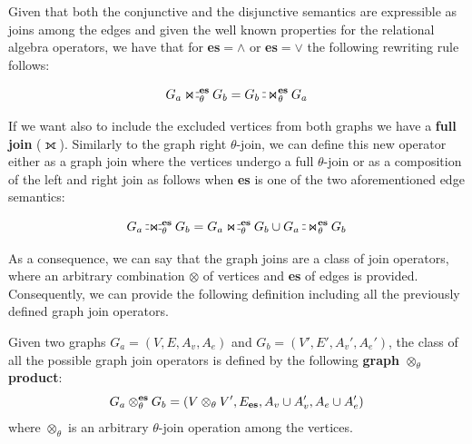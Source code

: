 Given that both the conjunctive and the disjunctive semantics are expressible as joins among the edges and given the well known  properties for the relational algebra operators, we have that for \textbf{es}$=\wedge$ or \textbf{es}$=\vee$ the following rewriting rule follows:

\[G_a\rightouterjoin_\theta^{\textbf{\textup{es}}} G_b = G_b\leftouterjoin_\theta^{\textbf{\textup{es}}} G_a\]

If we want also to include
the excluded vertices from both graphs we have a \textbf{full join}  ($\fullouterjoin$). Similarly to the graph right $\theta$-join, we can define this new operator either as a graph join where the vertices undergo a full $\theta$-join or as a composition of the left and right join as follows when \textbf{es} is one of the two aforementioned edge semantics:

\[G_a\fullouterjoin_\theta^{\textbf{\textup{es}}} G_b = G_a\rightouterjoin_\theta^{\textbf{\textup{es}}} G_b \cup G_a\leftouterjoin_\theta^{\textbf{\textup{es}}} G_b\]

As a consequence, we can say that the graph joins are a class of join operators, where an arbitrary combination $\otimes$ of vertices and \textbf{es} of edges is provided. Consequently, we can provide the following definition including all the previously defined graph join operators.

\begin{definition}\label{def:otimesjoin}
	\label{def:graphrightjointmes}
	Given two graphs $G_a=(V,E,A_v,A_e)$ and $G_b=(V',E',A_v',A_e')$, the class of all the possible graph join operators is defined by the following \textbf{graph $\otimes_\theta$ product}:
	\begin{equation*}
	G_a\otimes_\theta^{\textbf{\textup{es}}} G_b=(V\otimes_\theta V',E_{\textup{\textbf{es}}},A_v\cup A_v',A_e\cup A_e')
	\end{equation*}
	where $\otimes_\theta$ is an arbitrary $\theta$-join operation among the vertices.
\end{definition}


